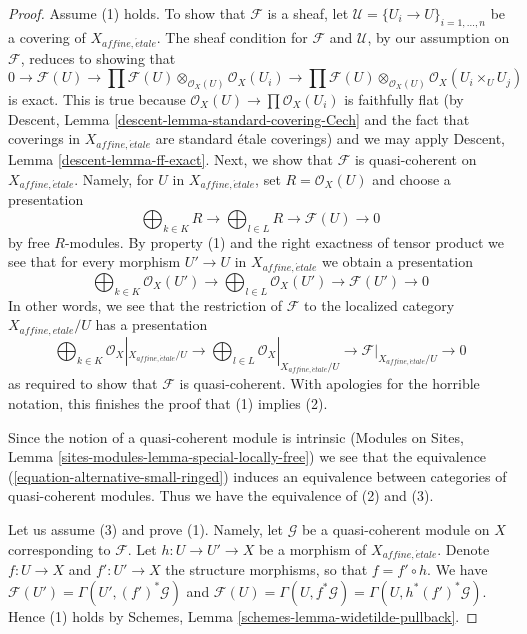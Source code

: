 \documentclass[10pt,a4paper]{amsart}
\theoremstyle{plain}
\theoremstyle{definition}
\theoremstyle{remark}
\numberwithin{equation}{subsection}
\def\etale{{\acute{e}tale}}
\begin{document}
\begin{proof}
Assume (1) holds. To show that $\mathcal{F}$ is a sheaf, let
$\mathcal{U} = \{U_i \to U\}_{i = 1, \ldots, n}$ be a covering
of $X_{affine, \etale}$. The sheaf condition for $\mathcal{F}$
and $\mathcal{U}$, by our assumption on $\mathcal{F}$,
reduces to showing that
$$
0 \to \mathcal{F}(U) \to
\prod \mathcal{F}(U) \otimes_{\mathcal{O}_X(U)} \mathcal{O}_X(U_i) \to
\prod \mathcal{F}(U) \otimes_{\mathcal{O}_X(U)} \mathcal{O}_X(U_i \times_U U_j)
$$
is exact. This is true because $\mathcal{O}_X(U) \to \prod \mathcal{O}_X(U_i)$
is faithfully flat
(by Descent, Lemma \ref{descent-lemma-standard-covering-Cech} and
the fact that coverings in $X_{affine, \etale}$ are standard \'etale
coverings) and we may apply Descent, Lemma \ref{descent-lemma-ff-exact}.
Next, we show that $\mathcal{F}$ is quasi-coherent on $X_{affine, \etale}$.
Namely, for $U$ in $X_{affine, \etale}$, set $R = \mathcal{O}_X(U)$
and choose a presentation
$$
\bigoplus\nolimits_{k \in K} R
\longrightarrow
\bigoplus\nolimits_{l \in L} R
\longrightarrow
\mathcal{F}(U)
\longrightarrow 0
$$
by free $R$-modules. By property (1) and the right exactness of tensor product
we see that for every morphism $U' \to U$ in $X_{affine, \etale}$
we obtain a presentation
$$
\bigoplus\nolimits_{k \in K} \mathcal{O}_X(U')
\longrightarrow
\bigoplus\nolimits_{l \in L} \mathcal{O}_X(U')
\longrightarrow
\mathcal{F}(U')
\longrightarrow 0
$$
In other words, we see that the restriction of $\mathcal{F}$
to the localized category $X_{affine, etale}/U$ has a presentation
$$
\bigoplus\nolimits_{k \in K} \mathcal{O}_X|_{X_{affine, \etale}/U}
\longrightarrow
\bigoplus\nolimits_{l \in L} \mathcal{O}_X|_{X_{affine, \etale}/U}
\longrightarrow
\mathcal{F}|_{X_{affine, \etale}/U}
\longrightarrow 0
$$
as required to show that $\mathcal{F}$ is quasi-coherent.
With apologies for the horrible notation, this finishes the proof
that (1) implies (2).

\medskip\noindent
Since the notion of a quasi-coherent module is intrinsic
(Modules on Sites, Lemma \ref{sites-modules-lemma-special-locally-free})
we see that the equivalence (\ref{equation-alternative-small-ringed})
induces an equivalence between categories of quasi-coherent modules.
Thus we have the equivalence of (2) and (3).

\medskip\noindent
Let us assume (3) and prove (1). Namely, let
$\mathcal{G}$ be a quasi-coherent module on $X$ corresponding to $\mathcal{F}$.
Let $h : U \to U' \to X$ be a morphism of $X_{affine, \etale}$.
Denote $f : U \to X$ and $f' : U' \to X$ the structure morphisms,
so that $f = f' \circ h$. We have
$\mathcal{F}(U') = \Gamma(U', (f')^*\mathcal{G})$ and
$\mathcal{F}(U) = \Gamma(U, f^*\mathcal{G}) = \Gamma(U, h^*(f')^*\mathcal{G})$.
Hence (1) holds by Schemes, Lemma \ref{schemes-lemma-widetilde-pullback}.
\end{proof}
\end{document}
